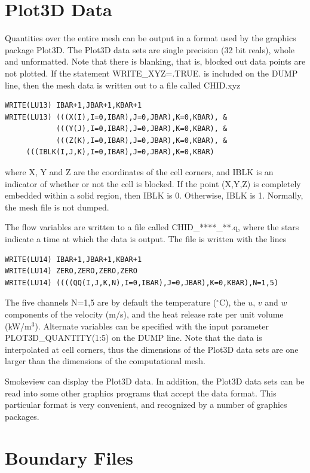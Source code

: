 \documentclass[11pt]{book}
\begin{document}
\section{Plot3D Data}
\label{out:PL3D}

Quantities over the entire mesh can be output in a format used by the graphics package Plot3D. The Plot3D data sets are single precision (32 bit reals), whole and unformatted. Note that there is blanking, that is, blocked out data points are not plotted. If the statement {\ct WRITE\_XYZ=.TRUE.} is included on the {\ct DUMP} line, then the mesh data is written out to a file called {\ct CHID.xyz}
\begin{lstlisting}
WRITE(LU13) IBAR+1,JBAR+1,KBAR+1
WRITE(LU13) (((X(I),I=0,IBAR),J=0,JBAR),K=0,KBAR), &
            (((Y(J),I=0,IBAR),J=0,JBAR),K=0,KBAR), &
            (((Z(K),I=0,IBAR),J=0,JBAR),K=0,KBAR), &
     (((IBLK(I,J,K),I=0,IBAR),J=0,JBAR),K=0,KBAR)
\end{lstlisting}
where {\ct X, Y} and {\ct Z} are the coordinates of the cell corners, and {\ct IBLK} is an indicator of whether or not the cell is blocked. If the point ({\ct X,Y,Z}) is completely embedded within a solid region, then {\ct IBLK} is 0. Otherwise, {\ct IBLK} is 1. Normally, the mesh file is not dumped.

The flow variables are written to a file called {\ct CHID\_****\_**.q}, where the stars indicate a time at which the data is output. The file is written with the lines
\begin{lstlisting}
WRITE(LU14) IBAR+1,JBAR+1,KBAR+1
WRITE(LU14) ZERO,ZERO,ZERO,ZERO
WRITE(LU14) ((((QQ(I,J,K,N),I=0,IBAR),J=0,JBAR),K=0,KBAR),N=1,5)
\end{lstlisting}
The five channels {\ct N=1,5} are by default the temperature ($^\circ$C), the $u$, $v$ and $w$ components of the velocity (m/s), and the heat release rate per unit volume (kW/m$^3$). Alternate variables can be specified with the input parameter {\ct PLOT3D\_QUANTITY(1:5)} on the {\ct DUMP} line. Note that the data is interpolated at cell corners, thus the dimensions of the Plot3D data sets are one larger than the dimensions of the computational mesh.

Smokeview can display the Plot3D data. In addition, the Plot3D data sets can be read into some other graphics programs that accept the data format. This particular format is very convenient, and recognized by a number of graphics packages.


\section{Boundary Files}
\label{out:BNDF}
\end{document}
